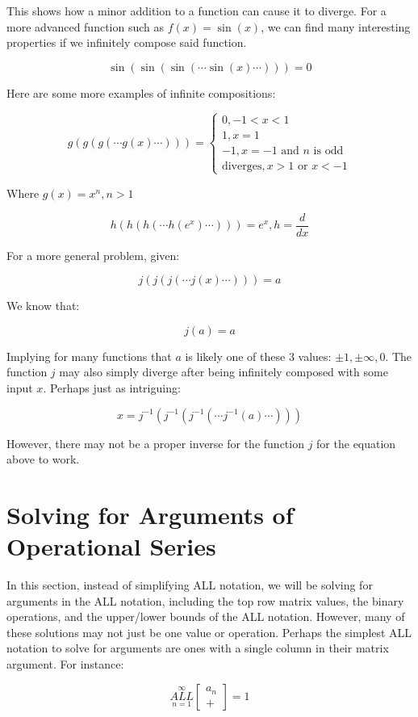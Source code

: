 \documentclass{article}
\begin{document}
This shows how a minor addition to a function can cause it to diverge. For a more advanced function such as $f(x)=\sin(x)$, we can find many interesting properties if we infinitely compose said function.

$$\sin ( \sin ( \sin (\cdots \sin (x) \cdots)))=0 $$

Here are some more examples of infinite compositions:

$$g(g(g(\cdots g(x) \cdots ))) = \left\{ \begin{array}{rcl}
0,-1<x<1 \\ 1, x=1 \\ -1, x=-1 \text{ and } n \text{ is odd} \\ \text{diverges}, x>1 \text{ or } x<-1\end{array}\right.$$

Where $g(x) = x^n, n>1$

$$h(h(h(\cdots h(e^x) \cdots ))) = e^x, h=\frac{d}{dx}$$

For a more general problem, given:

$$j(j(j( \cdots j(x) \cdots)))=a$$

We know that:

$$j(a)=a$$

Implying for many functions that $a$ is likely one of these 3 values: $\pm 1, \pm \infty, 0$. The function $j$ may also simply diverge after being infinitely composed with some input $x$. Perhaps just as intriguing:

$$x=j^{-1}(j^{-1}(j^{-1}( \cdots j^{-1}(a) \cdots )))$$

However, there may not be a proper inverse for the function $j$ for the equation above to work.

\section{Solving for Arguments of Operational Series}

In this section, instead of simplifying ALL notation, we will be solving for arguments in the ALL notation, including the top row matrix values, the binary operations, and the upper/lower bounds of the ALL notation. However, many of these solutions may not just be one value or operation. Perhaps the simplest ALL notation to solve for arguments are ones with a single column in their matrix argument. For instance:

$$\underset{n=1}{\overset{\infty}{ALL}} \begin{bmatrix}
a_n \\
+
\end{bmatrix} = 1$$
\end{document}
